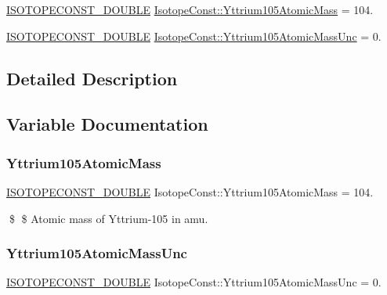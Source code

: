 \begin{DoxyCompactItemize}
\item 
\mbox{\hyperlink{group___isotope_const-_macros_ga8f45a7272ce02c0b4c65c44636ed719a}{I\+S\+O\+T\+O\+P\+E\+C\+O\+N\+S\+T\+\_\+\+D\+O\+U\+B\+LE}} \mbox{\hyperlink{group___isotope_const-_yttrium-_y105_ga2d4a2a74c67d803f3997a31c5d03c63b}{Isotope\+Const\+::\+Yttrium105\+Atomic\+Mass}} = 104.
\item 
\mbox{\hyperlink{group___isotope_const-_macros_ga8f45a7272ce02c0b4c65c44636ed719a}{I\+S\+O\+T\+O\+P\+E\+C\+O\+N\+S\+T\+\_\+\+D\+O\+U\+B\+LE}} \mbox{\hyperlink{group___isotope_const-_yttrium-_y105_gac4bbfb862fdcc238160484793967762f}{Isotope\+Const\+::\+Yttrium105\+Atomic\+Mass\+Unc}} = 0.
\end{DoxyCompactItemize}


\subsection{Detailed Description}


\subsection{Variable Documentation}
\mbox{\label{group___isotope_const-_yttrium-_y105_ga2d4a2a74c67d803f3997a31c5d03c63b}} 
\subsubsection{\texorpdfstring{Yttrium105\+Atomic\+Mass}{Yttrium105AtomicMass}}
{\footnotesize\ttfamily \mbox{\hyperlink{group___isotope_const-_macros_ga8f45a7272ce02c0b4c65c44636ed719a}{I\+S\+O\+T\+O\+P\+E\+C\+O\+N\+S\+T\+\_\+\+D\+O\+U\+B\+LE}} Isotope\+Const\+::\+Yttrium105\+Atomic\+Mass = 104.}

\$ \$ Atomic mass of Yttrium-\/105 in amu. \mbox{\label{group___isotope_const-_yttrium-_y105_gac4bbfb862fdcc238160484793967762f}} 
\subsubsection{\texorpdfstring{Yttrium105\+Atomic\+Mass\+Unc}{Yttrium105AtomicMassUnc}}
{\footnotesize\ttfamily \mbox{\hyperlink{group___isotope_const-_macros_ga8f45a7272ce02c0b4c65c44636ed719a}{I\+S\+O\+T\+O\+P\+E\+C\+O\+N\+S\+T\+\_\+\+D\+O\+U\+B\+LE}} Isotope\+Const\+::\+Yttrium105\+Atomic\+Mass\+Unc = 0.}

